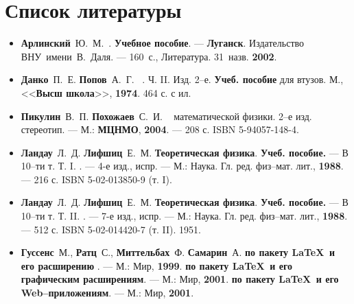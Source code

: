 \newpage
{}

\section{Список литературы}
\begin{itemize}
\item[\iconbook]
	{\bf Арлинский}~Ю.~М.~.\quad
	\hypertarget{Arlin}{{\bf Учебное пособие}}. --- {\bf Луганск}. Издательство
	ВНУ~имени~В.~Даля. --- 160~с., Литература. 31~назв. {\bf 2002}.
\item[\iconbook]
	{\bf Данко}~П.~Е. {\bf Попов}~А.~Г.
	~.\quad
	Ч. II.  Изд. 2--е. {\bf Учеб. пособие} для втузов. М.,
	<<{\bf Высш школа}>>, {\bf 1974}. 464 с. с ил.
\item[\iconbook]
	{\bf Пикулин}~В.~П. {\bf Похожаев}~С.~И.
	~
	\hypertarget{Pikul}{математической физики}.
	2--е изд. стереотип. --- М.: {\bf МЦНМО}, {\bf 2004}. --- 208 с.
  	ISBN 5-94057-148-4.
\item[\iconbook]
	{\bf Ландау}~Л.~Д. {\bf Лифшиц}~Е.~М.
	\hypertarget{Landa}{{\bf Теоретическая физика}}.
	{\bf Учеб. пособие.} --- В 10--ти т. Т.  I. .
	--- 4-е изд., испр. --- М.: Наука. Гл. ред. физ--мат. лит.,
	{\bf 1988}. --- 216 с.  ISBN 5-02-013850-9 (т. I).
\item[\iconbook]
	{\bf Ландау}~Л.~Д. {\bf Лифшиц}~Е.~М. {\bf Теоретическая физика}.
	{\bf Учеб. пособие.} --- В 10--ти т. Т.  II. .
	--- 7-е изд., испр. --- М.: Наука. Гл. ред. физ--мат. лит., {\bf 1988}.
	--- 512 с. ISBN 5-02-014420-7 (т. II).
	 1951.
\item[\iconbook]
	{\bf Гуссенс}~М., {\bf Ратц}~С., {\bf Миттельбах}~Ф. {\bf Самарин}~А.
	 {\bf по пакету \LaTeX\, и его расширению
	\LaTeXe}. --- М.: Мир, {\bf 1999}. 
	{\bf по пакету \LaTeX\, и его графическим расширениям}. --- М.: Мир,
	{\bf 2001}.  {\bf по пакету \LaTeX\, и его
	Web--приложениям}. --- М.: Мир, {\bf 2001}.
\end{itemize}
